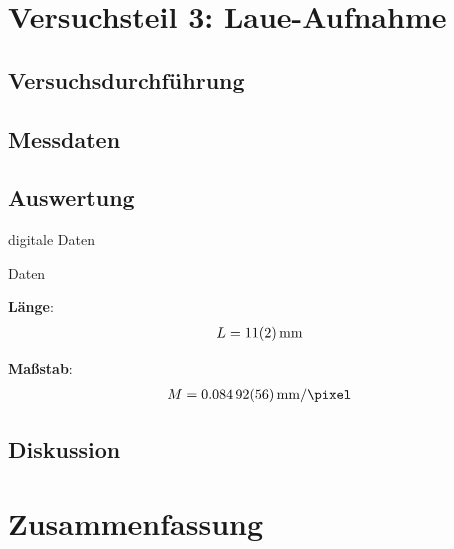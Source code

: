 \documentclass[10pt, a4paper]{article}
\begin{document}
\section{Versuchsteil 3: Laue-Aufnahme}
\subsection{Versuchsdurchführung}



\subsection{Messdaten}


\subsection{Auswertung}
\begin{table}[h]
\centering

\caption{digitale Daten}
\label{tab:laue_digi}
\end{table}

\begin{table}[h]
\centering

\caption{Daten}
\label{tab:laue_mm}
\end{table}


\textbf{Länge}:
\begin{align}
  L = \SI{11 +- 2}{\milli\metre}
\end{align}

\textbf{Maßstab}:
\begin{align}
  M = \SI{0.08492 +- 0.00056}{\milli\metre\per\pixel}
\end{align}


\subsection{Diskussion}


\section{Zusammenfassung}

\begin{figure}
\centering

\end{figure}

\begin{figure}
\centering

\end{figure}
\end{document}
